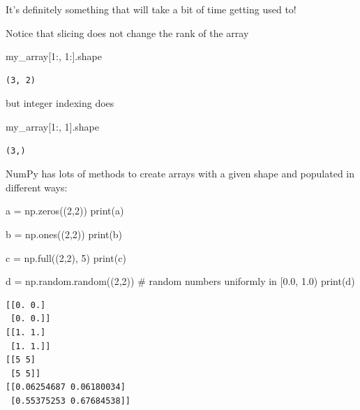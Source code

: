 \documentclass[
  letterpaper,
  DIV=11,
  numbers=noendperiod]{scrreprt}
\newenvironment{Shaded}{\begin{snugshade}}{\end{snugshade}}
\newcommand{\BuiltInTok}[1]{\textcolor[rgb]{0.00,0.23,0.31}{#1}}
\newcommand{\CommentTok}[1]{\textcolor[rgb]{0.37,0.37,0.37}{#1}}
\newcommand{\DecValTok}[1]{\textcolor[rgb]{0.68,0.00,0.00}{#1}}
\newcommand{\NormalTok}[1]{\textcolor[rgb]{0.00,0.23,0.31}{#1}}
\newcommand{\OperatorTok}[1]{\textcolor[rgb]{0.37,0.37,0.37}{#1}}
\theoremstyle{definition}
\theoremstyle{remark}
\begin{document}
It's definitely something that will take a bit of time getting used to!

Notice that slicing does not change the rank of the array

\begin{Shaded}
\begin{Highlighting}[]
\NormalTok{my\_array[}\DecValTok{1}\NormalTok{:, }\DecValTok{1}\NormalTok{:].shape}
\end{Highlighting}
\end{Shaded}

\begin{verbatim}
(3, 2)
\end{verbatim}

but integer indexing does

\begin{Shaded}
\begin{Highlighting}[]
\NormalTok{my\_array[}\DecValTok{1}\NormalTok{:, }\DecValTok{1}\NormalTok{].shape}
\end{Highlighting}
\end{Shaded}

\begin{verbatim}
(3,)
\end{verbatim}

NumPy has lots of methods to create arrays with a given shape and
populated in different ways:

\begin{Shaded}
\begin{Highlighting}[]
\NormalTok{a }\OperatorTok{=}\NormalTok{ np.zeros((}\DecValTok{2}\NormalTok{,}\DecValTok{2}\NormalTok{))}
\BuiltInTok{print}\NormalTok{(a)}

\NormalTok{b }\OperatorTok{=}\NormalTok{ np.ones((}\DecValTok{2}\NormalTok{,}\DecValTok{2}\NormalTok{))}
\BuiltInTok{print}\NormalTok{(b)}

\NormalTok{c }\OperatorTok{=}\NormalTok{ np.full((}\DecValTok{2}\NormalTok{,}\DecValTok{2}\NormalTok{), }\DecValTok{5}\NormalTok{)}
\BuiltInTok{print}\NormalTok{(c)}

\NormalTok{d }\OperatorTok{=}\NormalTok{ np.random.random((}\DecValTok{2}\NormalTok{,}\DecValTok{2}\NormalTok{)) }\CommentTok{\# random numbers uniformly in [0.0, 1.0)}
\BuiltInTok{print}\NormalTok{(d)}
\end{Highlighting}
\end{Shaded}

\begin{verbatim}
[[0. 0.]
 [0. 0.]]
[[1. 1.]
 [1. 1.]]
[[5 5]
 [5 5]]
[[0.06254687 0.06180034]
 [0.55375253 0.67684538]]
\end{verbatim}
\end{document}
